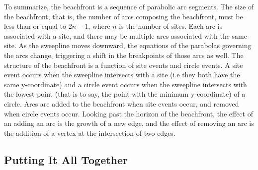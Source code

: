 \documentclass[12pt,twoside]{reedthesis}
\begin{document}
        To summarize, the beachfront is a sequence of parabolic arc segments. The size of the beachfront, that is, the number of arcs composing the beachfront, must be less than or equal to $2n-1$, where $n$ is the number of sites. Each arc is associated with a site, and there may be multiple arcs associated with the same site. As the sweepline moves downward, the equations of the parabolas governing the arcs change, triggering a shift in the breakpoints of those arcs as well. The structure of the beachfront is a function of site events and circle events. A site event occurs when the sweepline intersects with a site (i.e they both have the same y-coordinate) and a circle event occurs when the sweepline intersects with the lowest point (that is to say, the point with the minimum y-coordinate) of a circle. Arcs are added to the beachfront when site events occur, and removed when circle events occur. Looking past the horizon of the beachfront, the effect of an adding an arc is the growth of a new edge, and the effect of removing an arc is the addition of a vertex at the intersection of two edges.\par



    \subsection{Putting It All Together} %
    \label{sub:putting_it_all_together}
\end{document}
